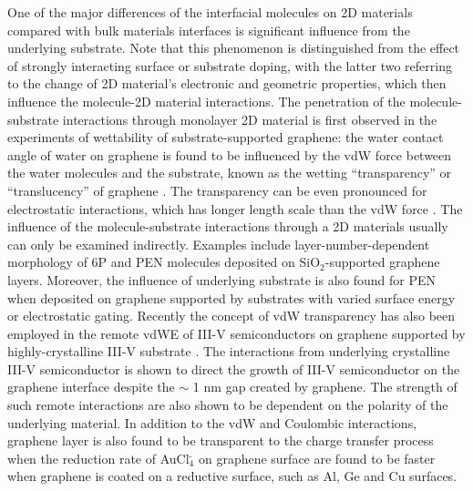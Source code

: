 One of the major differences of the interfacial molecules on 2D
materials compared with bulk materials interfaces is significant
influence from the underlying substrate. Note that this phenomenon is
distinguished from the effect of strongly interacting surface or
substrate doping, with the latter two referring to the change of 2D
material's electronic and geometric properties, which then influence
the molecule-2D material interactions. The penetration of the
molecule-substrate interactions through monolayer 2D material is first
observed in the experiments of wettability of substrate-supported
graphene: the water contact angle of water on graphene is found to be
influenced by the vdW force between the water molecules and the
substrate, known as the wetting ``transparency'' or ``translucency''
of graphene
\cite{rafiee_wetting_2012,shih_breakdown_2012,shih_wetting_2013}. The
transparency can be even pronounced for electrostatic interactions,
which has longer length scale than the vdW force
\cite{Shih_2015_PartiallyScreened,Tian_2016_multiscale}.  The
influence of the molecule-substrate interactions through a 2D
materials usually can only be examined indirectly.
%
Examples include layer-number-dependent morphology of
6P\cite{Kratzer_2014_6P_gr_layer} and
PEN\cite{Chhikara_2014_gr_pent_trans} molecules deposited on
SiO\(_{\text{2}}\)-supported graphene layers. Moreover, the influence
of underlying substrate is also found for PEN when deposited on
graphene supported by substrates with varied surface energy \cite{Nguyen_2015_pent_gr_wett} or
electrostatic gating. 
%
Recently the concept of vdW transparency has also been
employed in the remote vdWE of III-V semiconductors on graphene supported by highly-crystalline III-V substrate
\cite{Kim_2017_remote_epi_Gr}. 
%
The interactions from underlying crystalline III-V semiconductor is
shown to direct the growth of III-V semiconductor on the graphene
interface despite the $\sim{}$ 1 nm gap created by graphene. The
strength of such remote interactions are also shown to be dependent on
the polarity of the underlying material. 
%
In addition to the vdW and Coulombic interactions,
graphene layer is also found to be transparent to the charge transfer
process \cite{Jeong_2015_DA_transparency_gr} when the reduction rate of
AuCl\(_{\text{4}}^{\text{-}}\) on graphene surface are found to be
faster when graphene is coated on a reductive surface, such as Al, Ge
and Cu surfaces. 


